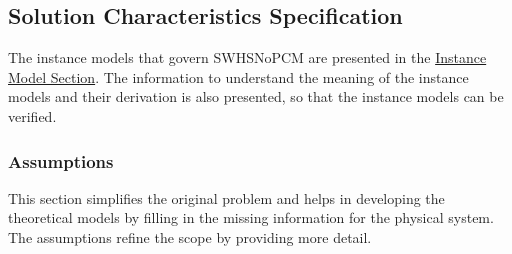 \documentclass[12pt]{article}
\begin{document}
\subsection{Solution Characteristics Specification}
\label{Sec:SolCharSpec}
The instance models that govern SWHSNoPCM are presented in the \hyperref[Sec:IMs]{Instance Model Section}. The information to understand the meaning of the instance models and their derivation is also presented, so that the instance models can be verified.

\subsubsection{Assumptions}
\label{Sec:Assumps}
This section simplifies the original problem and helps in developing the theoretical models by filling in the missing information for the physical system. The assumptions refine the scope by providing more detail.
\end{document}
